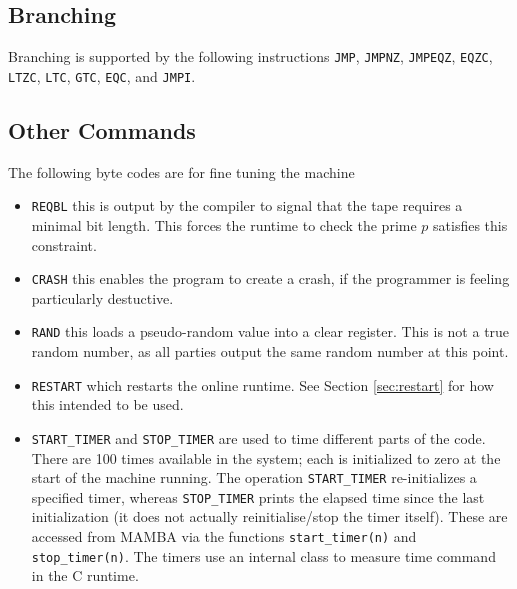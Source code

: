 \subsection{Branching}
Branching is supported by the following
instructions
 \verb+JMP+,
    \verb+JMPNZ+,
    \verb+JMPEQZ+,
    \verb+EQZC+,
    \verb+LTZC+,
    \verb+LTC+,
    \verb+GTC+,
    \verb+EQC+,
and
    \verb+JMPI+.

\subsection{Other Commands}
The following byte codes are for fine tuning the machine
\begin{itemize}
\item \verb+REQBL+ this is output by the compiler to signal that
the tape requires a minimal bit length. This forces the runtime
to check the prime $p$ satisfies this constraint.
\item \verb+CRASH+ this enables the program to create a crash,
if the programmer is feeling particularly destuctive.
\item \verb+RAND+ this loads a pseudo-random value into a
clear register. This is not a true random number, as all
parties output the same random number at this point.
\item \verb+RESTART+ which restarts the online runtime.
See Section \ref{sec:restart} for how this intended to be used.
\item \verb+START_TIMER+ and \verb+STOP_TIMER+ are used to time different
parts of the code. There are 100 times available in the system;
each is initialized to zero at the start of the machine running.
The operation \verb+START_TIMER+ re-initializes a specified timer,
whereas \verb+STOP_TIMER+ prints the elapsed time since the last
initialization (it does not actually reinitialise/stop the timer itself).
These are accessed from MAMBA via the functions
\verb+start_timer(n)+ and \verb+stop_timer(n)+.
The timers use an internal class to measure time command in the C runtime. 
\end{itemize}



